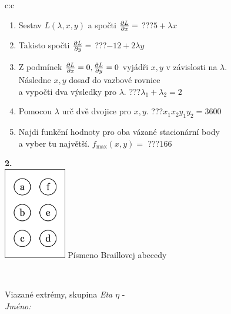\documentclass[10pt]{report}
\begin{document}
\begin{tabular}{c:c}
\begin{minipage}[c][104.5mm][t]{0.5\linewidth}
\begin{center}
\begin{minipage}{0.79\linewidth}
\begin{center}
\begin{varwidth}{\linewidth}
\begin{enumerate}
\item Sestav $L(\lambda,x,y)$ a spočti $\pdv{L}{x}=$\quad \dotfill\; ???\;\dotfill \quad $5+\lambda x$
\item Takisto spočti $\pdv{L}{y}=$\quad \dotfill\; ???\;\dotfill \quad $-12+2\lambda y$
\item Z podmínek $\pdv{L}{x}=0 , \pdv{L}{y}=0$ vyjádři $x,y$ v závislosti na $\lambda$.\\ \phantom{xxxxxx}Následne $x,y$ dosaď do vazbové rovnice\\ \phantom{xxxxxx}a vypočti dva výsledky pro $\lambda$.\quad \dotfill\; ???\;\dotfill \quad $\lambda_1+\lambda_2=2$
\item Pomocou $\lambda$ urč dvě dvojice pro $x,y$.\quad \dotfill\; ???\;\dotfill \quad $x_1 x_2 y_1 y_2=3600$
\item Najdi funkční hodnoty pro oba vázané stacionární body\\ \phantom{xxxxxx}a vyber tu najvětší. $f_{\text{max}}(x,y)=$\quad \dotfill\; ???\;\dotfill \quad $166$
\end{enumerate}
\end{varwidth}
\end{center}
\end{minipage}
\begin{minipage}{0.20\linewidth}
\begin{center}
{\Huge\bfseries 2.} \\[2mm]
\includegraphics[height=40mm]{../images/braille.png}
{\small Písmeno Braillovej abecedy}
\end{center}
\end{minipage}
\end{center}
\end{minipage}
\\ \hdashline
\begin{minipage}[c][104.5mm][t]{0.5\linewidth}
\begin{center}
\vspace{7mm}
{\huge Viazané extrémy, skupina \textit{Eta $\eta$} -}\\[5mm]
\textit{Jméno:}\phantom{xxxxxxxxxxxxxxxxxxxxxxxxxxxxxxxxxxxxxxxxxxxxxxxxxxxxxxxxxxxxxxxxx}\\[5mm]

\end{center}
\end{minipage}
\end{tabular}
\end{document}
